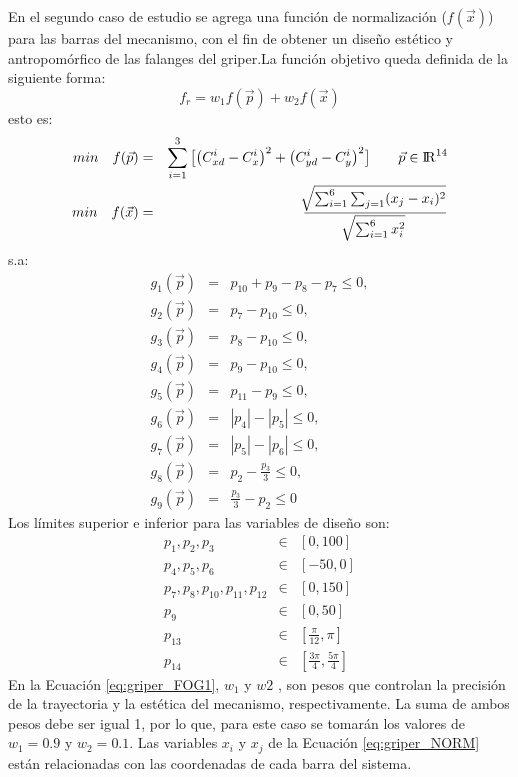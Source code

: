 En el segundo caso de estudio se agrega una función de normalización ($f(\vec{x})$) para las barras del mecanismo, con el fin de obtener un diseño  estético y antropomórfico de las falanges del griper.La función objetivo queda definida de la siguiente forma:
\begin{equation}\label{eq:griper_FOG1}
  f_r= w_1f(\vec{p})+w_2f(\vec{x})
\end{equation}
esto es:
 \begin{eqnarray}\label{}
min\quad  f(\vec{p})&=&
\sum_{i=1}^{3}\big[\big(C^{i}_{xd}-C^{i}_{x} \big)^2 +\big(C^{i}_{yd}-C^{i}_{y} \big)^2\big] \qquad \vec{p} \in  {\rm I\!R}^{14} \\
min\quad  f(\vec{x})&=&\frac{\sqrt[]{\sum^6_{i=1}\sum_{j=1}(x_j-x_i)^2}}{\sqrt[]{\sum^6_{i=1}x^2_i}} \label{eq:griper_NORM}
\end{eqnarray}
s.a:
\begin{eqnarray}\label{eq:Restricciones griper2}
g_{1}(\vec{p})&=&p_{10}+ p_{9}-p_{8}-p_{7} \leq 0,\\
g_{2}(\vec{p})&=&p_{7}-p_{10} \leq 0,\\
g_{3}(\vec{p})&=&p_{8}-p_{10} \leq 0,\\
g_{4}(\vec{p})&=&p_{9}-p_{10} \leq 0,\\
g_{5}(\vec{p})&=&p_{11}-p_{9} \leq 0,\\
g_{6}(\vec{p})&=&|p_{4}|-|p_{5}| \leq 0,\\
g_{7}(\vec{p})&=&|p_{5}|-|p_{6}| \leq 0,\\
g_{8}(\vec{p})&=&p_{2}-\frac{p_3}{3} \leq 0,\\
g_{9}(\vec{p})&=&\frac{p_3}{3}-p_{2} \leq 0
\end{eqnarray}
Los límites superior e inferior para las variables de diseño son:
\begin{eqnarray}\label{eq:limites variables griper1}
p_1,p_2,p_3 & \in & \left[ 0,100\right] \\
p_4,p_5,p_6 & \in & \left[ -50,0\right] \\
p_7,p_8,p_{10},p_{11},p_{12} & \in & \left[ 0,150 \right] \\
p_9 & \in & \left[ 0,50\right] \\
p_{13} & \in & \left[ \frac{\pi}{12},\pi \right] \\
p_{14} & \in & \left[ \frac{3\pi}{4},\frac{5\pi}{4} \right]
\end{eqnarray}
En la Ecuación \ref{eq:griper_FOG1}, $w_1$ y $w2$ , son pesos que controlan la precisión de la trayectoria y la estética del mecanismo, respectivamente. La suma de ambos pesos debe ser igual 1, por lo que, para este caso se tomarán los valores de $w_1=0.9$ y $w_2=0.1$. Las variables $x_i$ y $x_j$ de la Ecuación \ref{eq:griper_NORM} están relacionadas con las coordenadas de cada barra del sistema.

